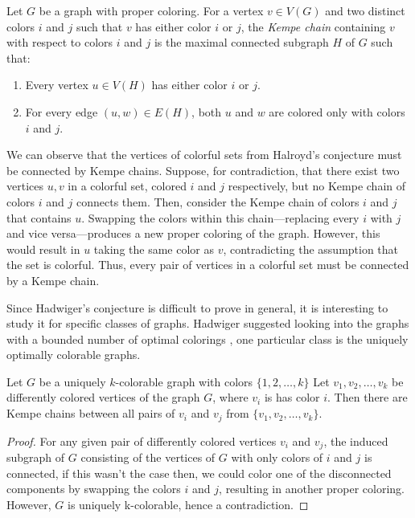 \begin{defn}
 Let $G$ be a graph with proper coloring. 
 For a vertex $v \in V(G)$ and two distinct colors $i$ and $j$ such that $v$ has either color $i$ or $j$, 
 the \textit{Kempe chain} containing $v$ with respect to colors $i$ and $j$ is the maximal connected subgraph
    $H$ of $G$ such that:
    \begin{enumerate}
        \item Every vertex $u \in V(H)$ has either color $i$ or $j$.
        \item For every edge $(u, w) \in E(H)$, both $u$ and $w$ are colored only with colors $i$ and $j$.
    \end{enumerate}
\end{defn}

We can observe that the vertices of colorful sets from Halroyd's conjecture must be connected by Kempe chains.
Suppose, for contradiction, that there exist two vertices  $u, v$ in a colorful set, colored  $i$ and  $j$ respectively,
but no Kempe chain of colors  $i$ and  $j$ connects them.
Then, consider the Kempe chain of colors  $i$ and  $j$ that contains  $u$. Swapping the colors within this chain—replacing every  $i$ with  $j$ and vice versa—produces a new proper coloring of the graph.
However, this would result in  $u$ taking the same color as  $v$, contradicting the assumption that the set is colorful.
Thus, every pair of vertices in a colorful set must be connected by a Kempe chain.

Since Hadwiger's conjecture is difficult to prove in general, it is interesting to study it for specific classes of graphs.
Hadwiger suggested looking into the graphs with a bounded number of optimal colorings \cite{hadwiger_1943}, 
one particular class is the uniquely optimally colorable graphs.

\begin{claim}
 Let $G$ be a uniquely $k$-colorable graph with colors $\{1, 2, \dots, k\}$ Let $v_1, v_2, \dots, v_k$ be differently colored vertices of the graph $G$, 
 where $v_i$ is has color $i$.
 Then there are Kempe chains between all pairs of $v_i$ and $v_j$ from $\{v_1, v_2, \dots, v_k\}$.
\end{claim}


\begin{proof}
 For any given pair of differently colored vertices $v_i$ and $v_j$, the induced subgraph of $G$ consisting of the vertices
 of $G$ with only colors of $i$ and $j$ is connected, if this wasn't the case
 then, we could color one of the disconnected components by swapping the colors $i$ and $j$, resulting in another proper coloring. 
 However, $G$ is uniquely k-colorable, hence a contradiction.
\end{proof}

